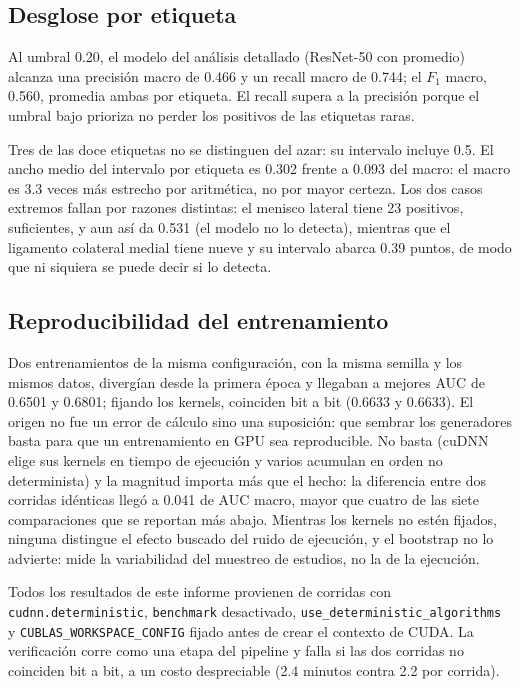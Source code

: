 \documentclass{article}
\begin{document}
\subsection{Desglose por etiqueta}



Al umbral 0.20, el modelo del análisis detallado (ResNet-50 con promedio) alcanza
una precisión macro de 0.466 y un recall macro de 0.744; el $F_1$ macro, 0.560,
promedia ambas por etiqueta. El recall supera a la precisión porque el umbral bajo
prioriza no perder los positivos de las etiquetas raras.

Tres de las doce etiquetas no se distinguen del azar: su intervalo
incluye 0.5. El ancho medio del intervalo por etiqueta es 0.302 frente a 0.093
del macro: el macro es 3.3 veces más estrecho por aritmética, no por mayor
certeza. Los dos casos extremos fallan por razones distintas: el menisco
lateral tiene 23 positivos, suficientes, y aun así da 0.531 (el modelo no lo
detecta), mientras que el ligamento colateral medial tiene nueve y su intervalo
abarca 0.39 puntos, de modo que ni siquiera se puede decir si lo detecta.

\subsection{Reproducibilidad del entrenamiento}
\label{sec:reproducibilidad}

Dos entrenamientos de la misma configuración, con la misma semilla y los mismos
datos, divergían desde la primera época y llegaban a mejores AUC de 0.6501 y
0.6801; fijando los kernels, coinciden bit a bit (0.6633 y 0.6633). El origen no
fue un error de cálculo sino una suposición: que sembrar los generadores basta
para que un entrenamiento en GPU sea reproducible. No basta (cuDNN elige sus
kernels en tiempo de ejecución y varios acumulan en orden no determinista) y la
magnitud importa más que el hecho: la diferencia entre dos corridas idénticas
llegó a 0.041 de AUC macro, mayor que cuatro de las siete comparaciones que se
reportan más abajo. Mientras los kernels no estén fijados, ninguna distingue el
efecto buscado del ruido de ejecución, y el bootstrap no lo advierte: mide la
variabilidad del muestreo de estudios, no la de la ejecución.

Todos los resultados de este informe provienen de corridas con
\texttt{cudnn.deterministic}, \texttt{benchmark} desactivado,
\texttt{use\_deterministic\_algorithms} y \texttt{CUBLAS\_WORKSPACE\_CONFIG}
fijado antes de crear el contexto de CUDA. La verificación corre como una etapa
del pipeline y falla si las dos corridas no coinciden bit a bit, a un costo
despreciable (2.4 minutos contra 2.2 por corrida).
\end{document}
